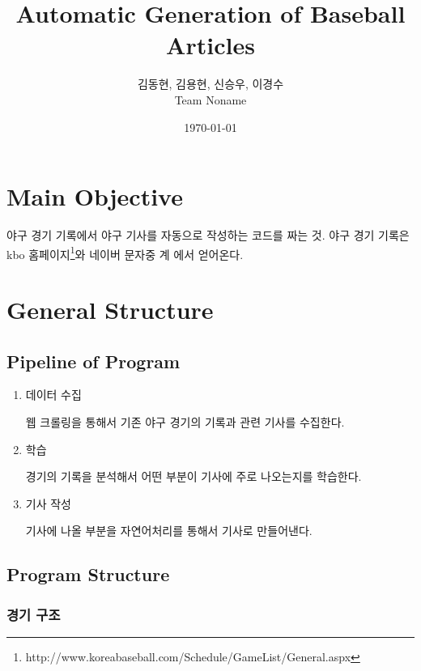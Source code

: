 \documentclass[twoside]{article}
\title{\vspace{-15mm}\fontsize{24pt}{10pt}\selectfont\textbf{Automatic Generation of Baseball Articles  }} %
\author{
\large
\textsc{김동현, 김용현, 신승우, 이경수}\\[2mm]
\normalsize Team Noname \\ %
\vspace{-5mm}
}
\date{\today}
\begin{document}
\maketitle %

\thispagestyle{fancy} %





\section{Main Objective}

야구 경기 기록에서 야구 기사를 자동으로 작성하는 코드를 짜는 것. 
야구 경기 기록은 kbo 홈페이지\footnote{http://www.koreabaseball.com/Schedule/GameList/General.aspx}와 네이버 문자중 계 에서 얻어온다.  

\section{General Structure}

\subsection{Pipeline of Program}

\begin{enumerate}
\item 데이터 수집 

웹 크롤링을 통해서 기존 야구 경기의 기록과 관련 기사를 수집한다. 

\item 학습 

경기의 기록을 분석해서 어떤 부분이 기사에 주로 나오는지를 학습한다. 

\item 기사 작성 

기사에 나올 부분을 자연어처리를 통해서 기사로 만들어낸다. 

\end{enumerate}

\subsection{Program Structure}


\subsubsection{경기 구조}
\end{document}
